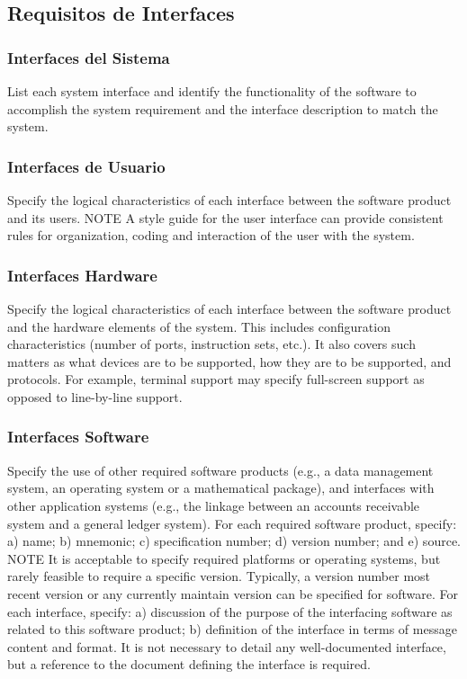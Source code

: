 \documentclass[12pt, a4paper, twoside]{article}
\begin{document}
\subsection{Requisitos de Interfaces}

 \subsubsection{Interfaces del Sistema}
 List each system interface and identify the functionality of the software to accomplish the system
 requirement and the interface description to match the system.

 \subsubsection{Interfaces de Usuario}
 Specify the logical characteristics of each interface between the software product and its users.
 NOTE A style guide for the user interface can provide consistent rules for organization, coding and
 interaction of the user with the system.

 \subsubsection{Interfaces Hardware}
 Specify the logical characteristics of each interface between the software product and the hardware
 elements of the system. This includes configuration characteristics (number of ports, instruction sets,
 etc.). It also covers such matters as what devices are to be supported, how they are to be supported, and
 protocols. For example, terminal support may specify full-screen support as opposed to line-by-line
 support.

 \subsubsection{Interfaces Software}
 Specify the use of other required software products (e.g., a data management system, an operating
 system or a mathematical package), and interfaces with other application systems (e.g., the linkage
 between an accounts receivable system and a general ledger system).
 For each required software product, specify:
 a) name;
 b) mnemonic;
 c) specification number;
 d) version number; and
 e) source.
 NOTE It is acceptable to specify required platforms or operating systems, but rarely feasible to require a
 specific version. Typically, a version number most recent version or any currently maintain version can be
 specified for software.
 For each interface, specify:
 a) discussion of the purpose of the interfacing software as related to this software product;
 b) definition of the interface in terms of message content and format. It is not necessary to detail any
 well-documented interface, but a reference to the document defining the interface is required.
\end{document}
